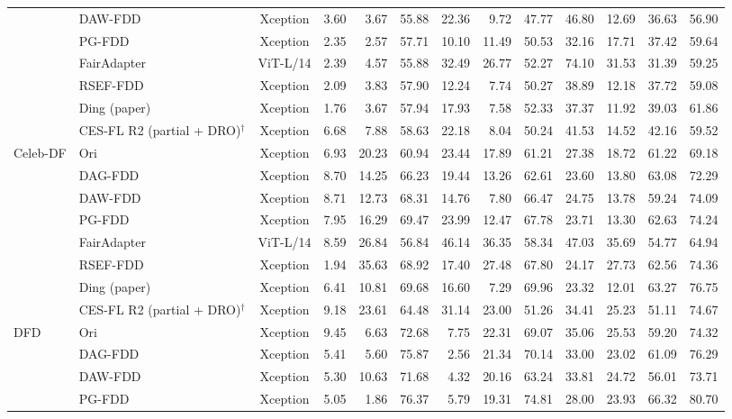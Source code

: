 \documentclass[9pt]{article}
\begin{document}
\begin{landscape}
\begin{longtable}{llc|rrr|rrr|rrr|r}
 & DAW-FDD & Xception & 3.60 & 3.67 & 55.88 & 22.36 & 9.72 & 47.77 & 46.80 & 12.69 & 36.63 & 56.90\\
 & PG-FDD & Xception & 2.35 & 2.57 & 57.71 & 10.10 & 11.49 & 50.53 & 32.16 & 17.71 & 37.42 & 59.64\\
 & FairAdapter & ViT-L/14 & 2.39 & 4.57 & 55.88 & 32.49 & 26.77 & 52.27 & 74.10 & 31.53 & 31.39 & 59.25\\
 & RSEF-FDD & Xception & 2.09 & 3.83 & 57.90 & 12.24 & 7.74 & 50.27 & 38.89 & 12.18 & 37.72 & 59.08\\
 & Ding (paper) & Xception & 1.76 & 3.67 & 57.94 & 17.93 & 7.58 & 52.33 & 37.37 & 11.92 & 39.03 & 61.86\\
\rowcolor{blue!8} & CES-FL R2 (partial + DRO)$^{\dagger}$ & Xception & 6.68 & 7.88 & 58.63 & 22.18 & 8.04 & 50.24 & 41.53 & 14.52 & 42.16 & 59.52\\
\midrule
\multirow{8}{*}{Celeb-DF} & Ori & Xception & 6.93 & 20.23 & 60.94 & 23.44 & 17.89 & 61.21 & 27.38 & 18.72 & 61.22 & 69.18\\
 & DAG-FDD & Xception & 8.70 & 14.25 & 66.23 & 19.44 & 13.26 & 62.61 & 23.60 & 13.80 & 63.08 & 72.29\\
 & DAW-FDD & Xception & 8.71 & 12.73 & 68.31 & 14.76 & 7.80 & 66.47 & 24.75 & 13.78 & 59.24 & 74.09\\
 & PG-FDD & Xception & 7.95 & 16.29 & 69.47 & 23.99 & 12.47 & 67.78 & 23.71 & 13.30 & 62.63 & 74.24\\
 & FairAdapter & ViT-L/14 & 8.59 & 26.84 & 56.84 & 46.14 & 36.35 & 58.34 & 47.03 & 35.69 & 54.77 & 64.94\\
 & RSEF-FDD & Xception & 1.94 & 35.63 & 68.92 & 17.40 & 27.48 & 67.80 & 24.17 & 27.73 & 62.56 & 74.36\\
 & Ding (paper) & Xception & 6.41 & 10.81 & 69.68 & 16.60 & 7.29 & 69.96 & 23.32 & 12.01 & 63.27 & 76.75\\
\rowcolor{blue!8} & CES-FL R2 (partial + DRO)$^{\dagger}$ & Xception & 9.18 & 23.61 & 64.48 & 31.14 & 23.00 & 51.26 & 34.41 & 25.23 & 51.11 & 74.67\\
\midrule
\multirow{8}{*}{DFD} & Ori & Xception & 9.45 & 6.63 & 72.68 & 7.75 & 22.31 & 69.07 & 35.06 & 25.53 & 59.20 & 74.32\\
 & DAG-FDD & Xception & 5.41 & 5.60 & 75.87 & 2.56 & 21.34 & 70.14 & 33.00 & 23.02 & 61.09 & 76.29\\
 & DAW-FDD & Xception & 5.30 & 10.63 & 71.68 & 4.32 & 20.16 & 63.24 & 33.81 & 24.72 & 56.01 & 73.71\\
 & PG-FDD & Xception & 5.05 & 1.86 & 76.37 & 5.79 & 19.31 & 74.81 & 28.00 & 23.93 & 66.32 & 80.70\\

\end{longtable}
\end{landscape}
\end{document}
